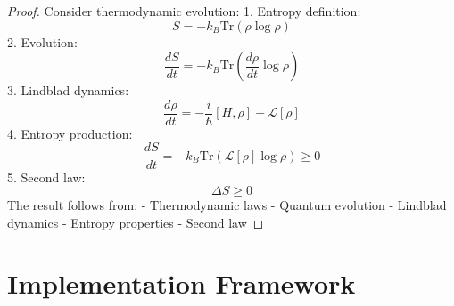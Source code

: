 \documentclass[12pt]{article}
\newcommand{\tr}{\text{Tr}}
\begin{document}
\begin{proof}
Consider thermodynamic evolution:
1. Entropy definition:
\begin{equation}
S = -k_B\tr(\rho\log\rho)
\end{equation}
2. Evolution:
\begin{equation}
\frac{dS}{dt} = -k_B\tr(\frac{d\rho}{dt}\log\rho)
\end{equation}
3. Lindblad dynamics:
\begin{equation}
\frac{d\rho}{dt} = -\frac{i}{\hbar}[H,\rho] + \mathcal{L}[\rho]
\end{equation}
4. Entropy production:
\begin{equation}
\frac{dS}{dt} = -k_B\tr(\mathcal{L}[\rho]\log\rho) \geq 0
\end{equation}
5. Second law:
\begin{equation}
\Delta S \geq 0
\end{equation}
The result follows from:
- Thermodynamic laws
- Quantum evolution
- Lindblad dynamics
- Entropy properties
- Second law
\end{proof}
\section{Implementation Framework}
\end{document}
